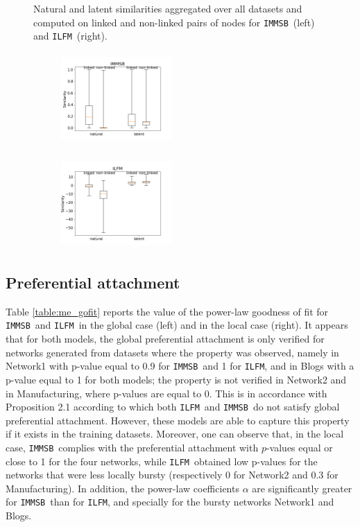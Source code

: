 \documentclass[french]{hermes-journal}
\newcommand{\ilfm}{\texttt{ILFM}}
\newcommand{\immsb}{\texttt{IMMSB}}
\begin{document}
\begin{figure}[ht]{Natural and latent similarities aggregated over all datasets and computed on linked and non-linked pairs of nodes for \immsb\ (left) and \ilfm\ (right).}
    \begin{subfigure}
       	 \centering
        	 \includegraphics[width=4.22cm,height=3.5cm]{img/corpus/homo_mustach_immsb}
    \end{subfigure}
    \begin{subfigure}
        	 \centering
          \includegraphics[width=4.22cm,height=3.5cm]{img/corpus/homo_mustach_ilfm}
    \end{subfigure}
    \label{fig:homo_mustach}
\end{figure}

\subsection{Preferential attachment}

Table \ref{table:me_gofit} reports the value of the power-law goodness of fit for \immsb\ and \ilfm\ in the global case (left) and in the local case (right). It appears that for both models, the global preferential attachment is only verified for networks generated from datasets where the property was observed, namely in Network1 with p-value equal to 0.9 for \immsb\ and 1 for \ilfm, and in Blogs with a p-value equal to 1 for both models; the property is not verified in Network2 and in Manufacturing, where p-values are equal to 0. This is in accordance with Proposition 2.1 according to which both \ilfm\ and \immsb\ do not satisfy global preferential attachment. However, these models are able to capture this property if it exists in the training datasets.  Moreover, one can observe that, in the local case, \immsb\ complies with the preferential attachment with $p$-values equal or close to 1 for the four networks, while \ilfm\ obtained low p-values for the networks that were less locally bursty (respectively  0  for Network2 and 0.3 for Manufacturing). In addition, the power-law coefficients $\alpha$ are significantly greater for \immsb\ than for \ilfm, and specially for the bursty networks Network1 and Blogs.
\end{document}
